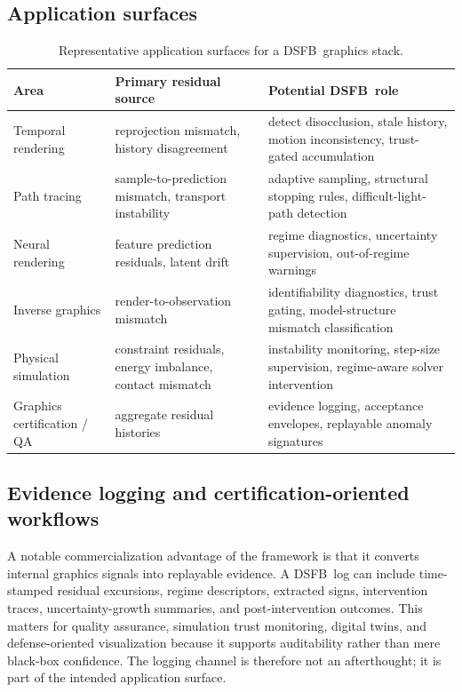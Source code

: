 \documentclass[11pt]{article}
\newcommand{\dsfb}{\textsc{DSFB}}
\theoremstyle{definition}
\theoremstyle{plain}
\begin{document}
\subsection{Application surfaces}
\begin{table}[H]
\centering
\caption{Representative application surfaces for a \dsfb\ graphics stack.}
\label{tab:applications}
\begin{tabularx}{\textwidth}{>{\raggedright\arraybackslash}p{} >{\raggedright\arraybackslash}p{} >{\raggedright\arraybackslash}X}
\toprule
\textbf{Area} & \textbf{Primary residual source} & \textbf{Potential \dsfb\ role} \\
\midrule
Temporal rendering & reprojection mismatch, history disagreement & detect disocclusion, stale history, motion inconsistency, trust-gated accumulation \\
Path tracing & sample-to-prediction mismatch, transport instability & adaptive sampling, structural stopping rules, difficult-light-path detection \\
Neural rendering & feature prediction residuals, latent drift & regime diagnostics, uncertainty supervision, out-of-regime warnings \\
Inverse graphics & render-to-observation mismatch & identifiability diagnostics, trust gating, model-structure mismatch classification \\
Physical simulation & constraint residuals, energy imbalance, contact mismatch & instability monitoring, step-size supervision, regime-aware solver intervention \\
Graphics certification / QA & aggregate residual histories & evidence logging, acceptance envelopes, replayable anomaly signatures \\
\bottomrule
\end{tabularx}
\end{table}

\subsection{Evidence logging and certification-oriented workflows}
A notable commercialization advantage of the framework is that it converts internal graphics signals into replayable evidence. A \dsfb\ log can include time-stamped residual excursions, regime descriptors, extracted signs, intervention traces, uncertainty-growth summaries, and post-intervention outcomes. This matters for quality assurance, simulation trust monitoring, digital twins, and defense-oriented visualization because it supports auditability rather than mere black-box confidence. The logging channel is therefore not an afterthought; it is part of the intended application surface.
\end{document}
